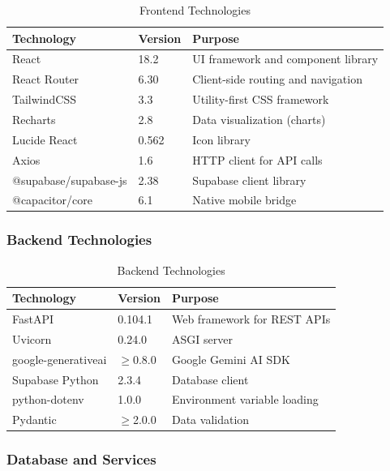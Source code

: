 \begin{table}[H]
\centering
\caption{Frontend Technologies}
\label{tab:frontend-tech}
\begin{tabular}{|p{4cm}|p{2cm}|p{7cm}|}
\hline
\textbf{Technology} & \textbf{Version} & \textbf{Purpose} \\
\hline
React & 18.2 & UI framework and component library \\
\hline
React Router & 6.30 & Client-side routing and navigation \\
\hline
TailwindCSS & 3.3 & Utility-first CSS framework \\
\hline
Recharts & 2.8 & Data visualization (charts) \\
\hline
Lucide React & 0.562 & Icon library \\
\hline
Axios & 1.6 & HTTP client for API calls \\
\hline
@supabase/supabase-js & 2.38 & Supabase client library \\
\hline
@capacitor/core & 6.1 & Native mobile bridge \\
\hline
\end{tabular}
\end{table}

\subsubsection{Backend Technologies}

\begin{table}[H]
\centering
\caption{Backend Technologies}
\label{tab:backend-tech}
\begin{tabular}{|p{4cm}|p{2cm}|p{7cm}|}
\hline
\textbf{Technology} & \textbf{Version} & \textbf{Purpose} \\
\hline
FastAPI & 0.104.1 & Web framework for REST APIs \\
\hline
Uvicorn & 0.24.0 & ASGI server \\
\hline
google-generativeai & $\geq$0.8.0 & Google Gemini AI SDK \\
\hline
Supabase Python & 2.3.4 & Database client \\
\hline
python-dotenv & 1.0.0 & Environment variable loading \\
\hline
Pydantic & $\geq$2.0.0 & Data validation \\
\hline
\end{tabular}
\end{table}

\subsubsection{Database and Services}

